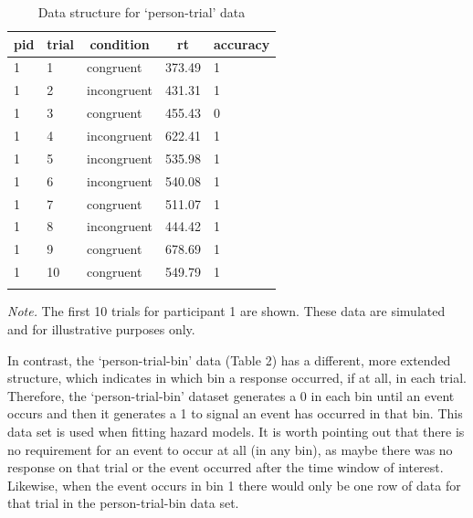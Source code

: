 \documentclass[
  man,floatsintext]{apa6}
\begin{document}
\begin{table}[H]

\begin{center}
\begin{threeparttable}

\caption{\label{tab:ca-data-table}Data structure for `person-trial' data}

\begin{tabular}{lllll}
\toprule
pid & \multicolumn{1}{c}{trial} & \multicolumn{1}{c}{condition} & \multicolumn{1}{c}{rt} & \multicolumn{1}{c}{accuracy}\\
\midrule
1 & 1 & congruent & 373.49 & 1\\
1 & 2 & incongruent & 431.31 & 1\\
1 & 3 & congruent & 455.43 & 0\\
1 & 4 & incongruent & 622.41 & 1\\
1 & 5 & incongruent & 535.98 & 1\\
1 & 6 & incongruent & 540.08 & 1\\
1 & 7 & congruent & 511.07 & 1\\
1 & 8 & incongruent & 444.42 & 1\\
1 & 9 & congruent & 678.69 & 1\\
1 & 10 & congruent & 549.79 & 1\\
\bottomrule
\addlinespace
\end{tabular}

\begin{tablenotes}[para]
\normalsize{\textit{Note.} The first 10 trials for participant 1 are shown. These data are simulated and for illustrative purposes only.}
\end{tablenotes}

\end{threeparttable}
\end{center}

\end{table}

In contrast, the `person-trial-bin' data (Table 2) has a different, more extended structure, which indicates in which bin a response occurred, if at all, in each trial. Therefore, the `person-trial-bin' dataset generates a 0 in each bin until an event occurs and then it generates a 1 to signal an event has occurred in that bin. This data set is used when fitting hazard models. It is worth pointing out that there is no requirement for an event to occur at all (in any bin), as maybe there was no response on that trial or the event occurred after the time window of interest. Likewise, when the event occurs in bin 1 there would only be one row of data for that trial in the person-trial-bin data set.
\end{document}
